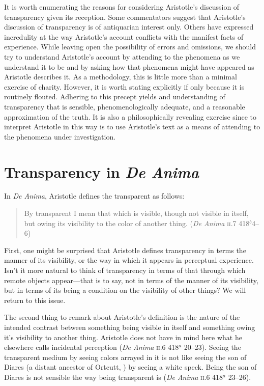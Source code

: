 It is worth enumerating the reasons for considering Aristotle's discussion of transparency given its reception. Some commentators suggest that Aristotle's discussion of transparency is of antiquarian interest only. Others have expressed incredulity at the way Aristotle's account conflicts with the manifest facts of experience. While leaving open the possibility of errors and omissions, we should try to understand Aristotle's account by attending to the phenomena as we understand it to be and by asking how that phenomena might have appeared as Aristotle describes it. As a methodology, this is little more than a minimal exercise of charity. However, it is worth stating explicitly if only because it is routinely flouted. Adhering to this precept yields and understanding of transparency that is sensible, phenomenologically adequate, and a reasonable approximation of the truth. It is also a philosophically revealing exercise since to interpret Aristotle in this way is to use Aristotle's text as a means of attending to the phenomena under investigation.


\section{Transparency in \emph{De Anima}} %
\label{sec:transparency_in_de_anima}

In \emph{De Anima}, Aristotle defines the transparent as follows:
\begin{quote}
	By transparent I mean that which is visible, though not visible in itself, but owing its visibility to the color of another thing. (\emph{De Anima} \textsc{ii}.7 418\( ^{b} \)4--6)
\end{quote}

First, one might be surprised that Aristotle defines transparency in terms the manner of its visibility, or the way in which it appears in perceptual experience. Isn't it more natural to think of transparency in terms of that through which remote objects appear---that is to say, not in terms of the manner of its visibility, but in terms of its being a condition on the visibility of other things? We will return to this issue.

The second thing to remark about Aristotle's definition is the nature of the intended contrast between something being visible in itself and something owing it's visibility to another thing. Aristotle does not have in mind here what he elsewhere calls incidental perception (\emph{De Anima} \textsc{ii}.6 418\( ^{a} \) 20--23). Seeing the transparent medium by seeing colors arrayed in it is not like seeing the son of Diares (a distant ancestor of Ortcutt, \citealt{Quine:1956qp}) by seeing a white speck. Being the son of Diares is not sensible the way being transparent is (\emph{De Anima} \textsc{ii}.6 418\( ^{a} \) 23--26).

